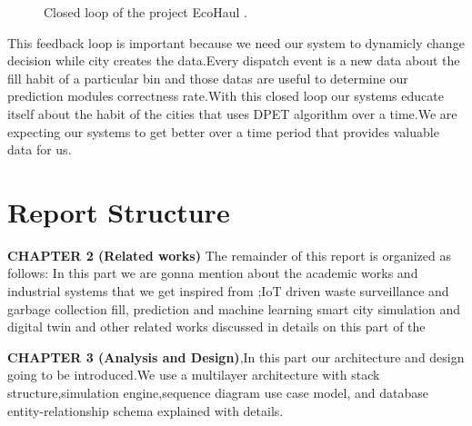 \documentclass[12pt,a4paper]{report}
\begin{document}
\begin{figure}[H]
\centering
{}
\caption{Closed loop of the project EcoHaul .}
\label{fig:feedback_loop}
\end{figure}



\indent This feedback loop is important because we need our system to dynamicly change decision while city creates the data.Every dispatch event is a new data about the fill habit of a particular bin and those datas are useful to determine our prediction modules correctness rate.With this closed loop our systems educate itself about the habit of the cities that uses DPET algorithm over a time.We are expecting our systems to get better over a time period that provides valuable data for us.

\section{Report Structure}

\indent \textbf {CHAPTER 2 (Related works)} The remainder of this report is organized as follows:
In this part we are gonna mention about the academic works and industrial systems that we get inspired from ;IoT driven waste surveillance and garbage collection fill, prediction  and machine learning smart city simulation and digital twin and other related works discussed in details on this part of the

\indent \textbf{CHAPTER 3 (Analysis and Design)},In this part our architecture and design going to be introduced.We use a multilayer architecture with stack structure,simulation engine,sequence diagram use case model, and database entity-relationship schema explained with details.
\end{document}
